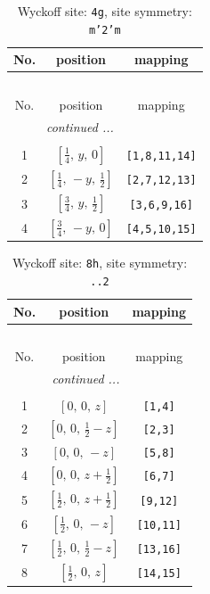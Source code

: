 \documentclass[fleqn,8pt]{jsarticle}
\begin{document}
\renewcommand{\arraystretch}{1.2}
\begin{longtable}{ccc}
\caption{Wyckoff site: {\tt 4g}, site symmetry: {\tt m'2'm}}
 \\
 \hline \hline
No. & position & mapping \\ \hline \endfirsthead

\multicolumn{2}{l}{\tablename\ \thetable{}} \\
 \hline \hline
No. & position & mapping \\ \hline \endhead

 \hline \hline
\multicolumn{2}{r}{\footnotesize\it continued ...} \\ \endfoot

 \hline \hline
\multicolumn{2}{r}{} \\ \endlastfoot

1 & $\left[ \frac{1}{4},\, y,\, 0 \right]$ & {\tt [1,8,11,14]} \\ \hline
2 & $\left[ \frac{1}{4},\, - y,\, \frac{1}{2} \right]$ & {\tt [2,7,12,13]} \\ \hline
3 & $\left[ \frac{3}{4},\, y,\, \frac{1}{2} \right]$ & {\tt [3,6,9,16]} \\ \hline
4 & $\left[ \frac{3}{4},\, - y,\, 0 \right]$ & {\tt [4,5,10,15]} \\
\end{longtable}
\renewcommand{\arraystretch}{1.2}
\begin{longtable}{ccc}
\caption{Wyckoff site: {\tt 8h}, site symmetry: {\tt ..2}}
 \\
 \hline \hline
No. & position & mapping \\ \hline \endfirsthead

\multicolumn{2}{l}{\tablename\ \thetable{}} \\
 \hline \hline
No. & position & mapping \\ \hline \endhead

 \hline \hline
\multicolumn{2}{r}{\footnotesize\it continued ...} \\ \endfoot

 \hline \hline
\multicolumn{2}{r}{} \\ \endlastfoot

1 & $\left[ 0,\, 0,\, z \right]$ & {\tt [1,4]} \\ \hline
2 & $\left[ 0,\, 0,\, \frac{1}{2} - z \right]$ & {\tt [2,3]} \\ \hline
3 & $\left[ 0,\, 0,\, - z \right]$ & {\tt [5,8]} \\ \hline
4 & $\left[ 0,\, 0,\, z + \frac{1}{2} \right]$ & {\tt [6,7]} \\ \hline
5 & $\left[ \frac{1}{2},\, 0,\, z + \frac{1}{2} \right]$ & {\tt [9,12]} \\ \hline
6 & $\left[ \frac{1}{2},\, 0,\, - z \right]$ & {\tt [10,11]} \\ \hline
7 & $\left[ \frac{1}{2},\, 0,\, \frac{1}{2} - z \right]$ & {\tt [13,16]} \\ \hline
8 & $\left[ \frac{1}{2},\, 0,\, z \right]$ & {\tt [14,15]} \\
\end{longtable}
\end{document}
